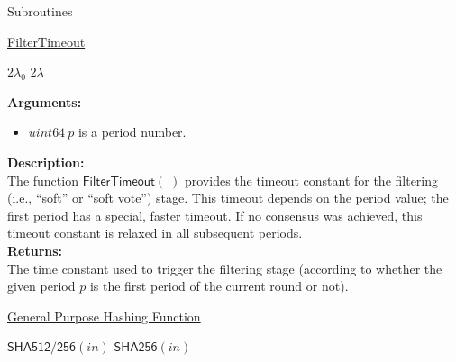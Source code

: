 \documentclass[10pt,a4paper]{article}
\begin{document}
\begin{section}{Subroutines}\label{sect:soubroutines}


\begin{algorithm}[H]
    \caption{\underline{FilterTimeout}}
    \label{algo:filter-timeout}
    \begin{algorithmic}[1]
            \State \Return $2\lambda_0$
        \Else 
            \State \Return $2\lambda$
        \EndIf
    \EndFunction
    \end{algorithmic}
\end{algorithm}

\noindent \textbf{Arguments:}
\begin{itemize}
    \item $uint64 \ p$ is a period number.
  \end{itemize}

\noindent \textbf{Description:}\\
The function $\mathsf{FilterTimeout}(\;)$ provides the timeout 
constant for the filtering (i.e., ``soft'' or ``soft vote'') stage.
This timeout depends on the period value; the first period has a special, faster timeout.
If no consensus was achieved, this timeout constant is relaxed in all subsequent periods.\\ 

\noindent \textbf{Returns:}\\
The time constant used to trigger the filtering stage (according to whether the given
    period $p$ is the first period of the current round or not).


\begin{algorithm}[H]
    \caption{\underline{General Purpose Hashing Function}}
    \begin{algorithmic}[1]
            \State \Return $\mathsf{SHA512/256}(in)$
        \Else
            \State \Return $\mathsf{SHA256}(in)$
        \EndIf
    \EndFunction
    \end{algorithmic}
\end{algorithm}


\end{section}
\end{document}
